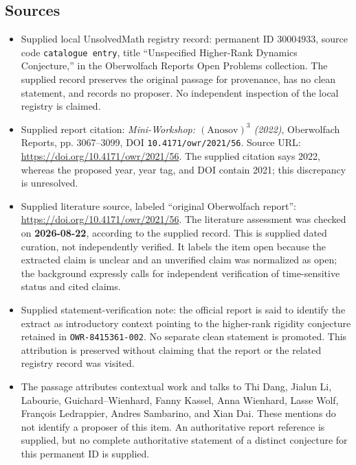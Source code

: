\documentclass[11pt]{article}
\begin{document}
\subsection{Sources}
\begin{itemize}
\item Supplied local UnsolvedMath registry record: permanent ID \(30004933\), source code \texttt{catalogue entry}, title ``Unspecified Higher-Rank Dynamics Conjecture,'' in the Oberwolfach Reports Open Problems collection. The supplied record preserves the original passage for provenance, has no clean statement, and records no proposer. No independent inspection of the local registry is claimed.
\item Supplied report citation: \emph{Mini-Workshop: \((\mathrm{Anosov})^3\) (2022)}, Oberwolfach Reports, pp. 3067--3099, DOI \texttt{10.4171/owr/2021/56}. Source URL: \url{https://doi.org/10.4171/owr/2021/56}. The supplied citation says 2022, whereas the proposed year, year tag, and DOI contain 2021; this discrepancy is unresolved.
\item Supplied literature source, labeled ``original Oberwolfach report'': \url{https://doi.org/10.4171/owr/2021/56}. The literature assessment was checked on \textbf{2026-08-22}, according to the supplied record. This is supplied dated curation, not independently verified. It labels the item open because the extracted claim is unclear and an unverified claim was normalized as open; the background expressly calls for independent verification of time-sensitive status and cited claims.
\item Supplied statement-verification note: the official report is said to identify the extract as introductory context pointing to the higher-rank rigidity conjecture retained in \texttt{OWR-8415361-002}. No separate clean statement is promoted. This attribution is preserved without claiming that the report or the related registry record was visited.
\item The passage attributes contextual work and talks to Thi Dang, Jialun Li, Labourie, Guichard--Wienhard, Fanny Kassel, Anna Wienhard, Lasse Wolf, Fran\c{c}ois Ledrappier, Andres Sambarino, and Xian Dai. These mentions do not identify a proposer of this item. An authoritative report reference is supplied, but no complete authoritative statement of a distinct conjecture for this permanent ID is supplied.
\end{itemize}
\end{document}
